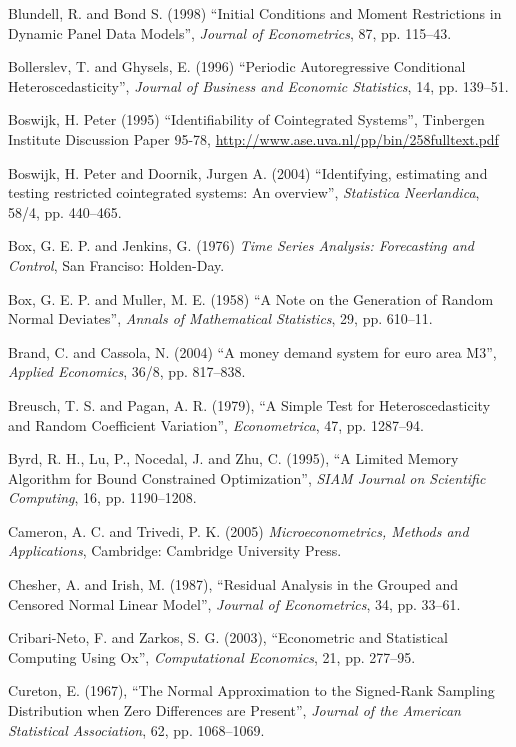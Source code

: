 \begin{thebibliography}
  Blundell, R. and Bond S. (1998) ``Initial Conditions and Moment
  Restrictions in Dynamic Panel Data Models'', \emph{Journal of
    Econometrics}, 87, pp. 115--43.

  Bollerslev, T. and Ghysels, E. (1996) ``Periodic Autoregressive
  Conditional Heteroscedasticity'', \emph{Journal of Business and
    Economic Statistics}, 14, pp. 139--51.

  Boswijk, H. Peter (1995) ``Identifiability of Cointegrated
  Systems'', Tinbergen Institute Discussion Paper 95-78,
  \url{http://www.ase.uva.nl/pp/bin/258fulltext.pdf}

  Boswijk, H. Peter and Doornik, Jurgen A. (2004) ``Identifying,
  estimating and testing restricted cointegrated systems: An
  overview'', \textit{Statistica Neerlandica}, 58/4, pp.
  440--465.

  Box, G. E. P. and Jenkins, G. (1976) \textit{Time Series Analysis:
  Forecasting and Control}, San Franciso: Holden-Day.

  Box, G. E. P. and Muller, M. E.  (1958) ``A Note on the Generation
  of Random Normal Deviates'', \emph{Annals of Mathematical
    Statistics}, 29, pp. 610--11.

  Brand, C. and Cassola, N.  (2004) ``A money demand system for euro
  area M3'', \emph{Applied Economics}, 36/8, pp. 817--838.

  Breusch, T. S. and Pagan, A. R. (1979), ``A Simple Test for
  Heteroscedasticity and Random Coefficient Variation'',
  \emph{Econometrica}, 47, pp. 1287--94.

  Byrd, R. H., Lu, P., Nocedal, J. and Zhu, C. (1995), ``A Limited
  Memory Algorithm for Bound Constrained Optimization'', \emph{SIAM
  Journal on Scientific Computing}, 16, pp. 1190--1208.

  Cameron, A. C. and Trivedi, P. K. (2005) \emph{Microeconometrics,
  Methods and Applications}, Cambridge: Cambridge University Press.

  Chesher, A. and Irish, M. (1987), ``Residual Analysis in the Grouped
  and Censored Normal Linear Model'', \emph{Journal of Econometrics},
  34, pp. 33--61.

  Cribari-Neto, F. and Zarkos, S. G. (2003), ``Econometric and
  Statistical Computing Using Ox'', \emph{Computational Economics},
  21, pp. 277--95.

  Cureton, E. (1967), ``The Normal Approximation to the Signed-Rank
  Sampling Distribution when Zero Differences are Present'',
  \emph{Journal of the American Statistical Association}, 62, pp.
  1068--1069.


\end{thebibliography}
